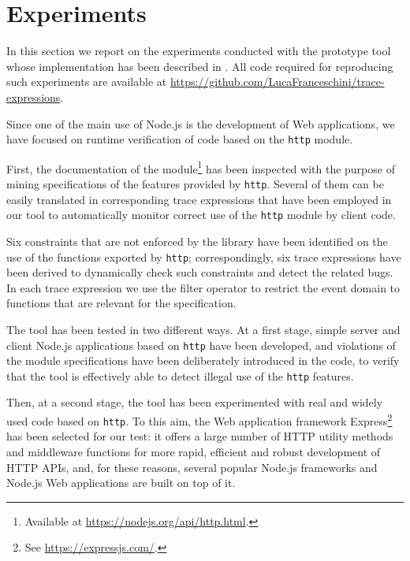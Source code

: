 \section{Experiments}
\label{sec:exps}

In this section we report on the experiments conducted with the prototype tool
whose implementation has been described in . All code required for reproducing such experiments are available
at \url{https://github.com/LucaFranceschini/trace-expressions}. %

Since one of the main use of Node.js is the development of Web applications,
we have focused on runtime verification of code based on the \lstinline{http} module.

First, the documentation of the module\footnote{Available at \url{https://nodejs.org/api/http.html}.} has been inspected with the purpose of mining specifications of the features provided by \lstinline{http}.
Several of them can be easily translated in corresponding trace expressions
that have been employed in our tool to automatically monitor correct use of the \lstinline{http}
module by client code.

Six constraints that are not enforced by the library have been identified on the use of the functions exported by \lstinline{http};
correspondingly, six trace expressions have been derived to
dynamically check such constraints and detect the related bugs.
In each trace expression we use the filter operator to restrict the event domain to functions that are relevant for the specification.

The tool has been tested in two different ways.
At a first stage, simple server and client Node.js applications based on \lstinline{http} have been developed,
and violations of the module specifications have been deliberately introduced in the code,
to verify that the tool is effectively able to detect illegal use of the \lstinline{http} features.

Then, at a second stage, the tool has been experimented with real and widely used code based on  \lstinline{http}.
To this aim, the Web application framework Express\footnote{See \url{https://expressjs.com/}.} has been
selected for our test: it offers a large number of HTTP utility methods and middleware functions for more rapid, efficient
and robust development of HTTP APIs, and, for these reasons, several popular Node.js frameworks and Node.js Web applications
are built on top of it.


